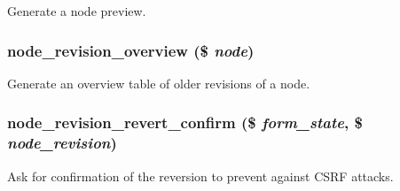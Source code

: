 Generate a node preview. \hypertarget{node_8pages_8inc_1654ae495e6814b2f08c7a8e4aeabd68}{
\subsubsection[{node\_\-revision\_\-overview}]{\setlength{\rightskip}{0pt plus 5cm}node\_\-revision\_\-overview (\$ {\em node})}}
\label{node_8pages_8inc_1654ae495e6814b2f08c7a8e4aeabd68}


Generate an overview table of older revisions of a node. \hypertarget{node_8pages_8inc_0402ef184e558e0cc3c679318a27e43d}{
\subsubsection[{node\_\-revision\_\-revert\_\-confirm}]{\setlength{\rightskip}{0pt plus 5cm}node\_\-revision\_\-revert\_\-confirm (\$ {\em form\_\-state}, \/  \$ {\em node\_\-revision})}}
\label{node_8pages_8inc_0402ef184e558e0cc3c679318a27e43d}


Ask for confirmation of the reversion to prevent against CSRF attacks. 